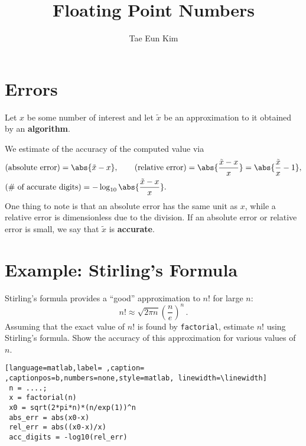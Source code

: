 \documentclass[]{ximera}
\author{Tae Eun Kim}
\date{}
\title{Floating Point Numbers}
\begin{document}
\maketitle
\section{Errors}
Let $x$ be some number of interest and let $\tilde{x}$ be an approximation to it obtained by an \textbf{algorithm}.

We estimate of the accuracy of the computed value via
\begin{align*}
  &\text{(absolute error)}
    = \abs{\tilde{x}-x}, \qquad
  \text{(relative error)}
    = \abs{\frac{\tilde{x}-x}{x}}
    = \abs{\frac{\tilde{x}}{x} - 1}, \\
  &\text{(\# of accurate digits)}
    = -\log_{10} \abs{\frac{\tilde{x}-x}{x}}.
\end{align*}
One thing to note is that an absolute error has the same unit as $x$, while a relative error is dimensionless due to the division. If an absolute error or relative error is small, we say that $\tilde{x}$ is \textbf{accurate}.

\section{Example: Stirling's Formula}
Stirling's formula provides a ``good'' approximation to $n!$ for large $n$:
\begin{equation}
  \label{eq:stirling}
  n! \approx \sqrt{2 \pi n} {\left( \frac{n}{e} \right)}^n \,.
  \tag{$\star$}
\end{equation}
Assuming that the exact value of $n!$ is found by \texttt{factorial}, estimate $n!$ using Stirling's formula. Show the accuracy of this approximation for various values of $n$.

\begin{lstlisting}[language=matlab,label= ,caption= ,captionpos=b,numbers=none,style=matlab, linewidth=\linewidth]
 n = ....;
 x = factorial(n)
 x0 = sqrt(2*pi*n)*(n/exp(1))^n
 abs_err = abs(x0-x)
 rel_err = abs((x0-x)/x)
 acc_digits = -log10(rel_err)
\end{lstlisting}
\end{document}
